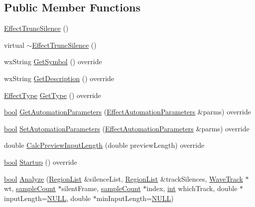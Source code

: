 \subsection*{Public Member Functions}
\begin{DoxyCompactItemize}
\item 
\hyperlink{class_effect_trunc_silence_a511e243b524d44a2e1b04d267779c808}{Effect\+Trunc\+Silence} ()
\item 
virtual \hyperlink{class_effect_trunc_silence_a809e25b236478f443634c3b8c0c31fb4}{$\sim$\+Effect\+Trunc\+Silence} ()
\item 
wx\+String \hyperlink{class_effect_trunc_silence_af21c9278ec1517512bcfe5caea204dbd}{Get\+Symbol} () override
\item 
wx\+String \hyperlink{class_effect_trunc_silence_a1ca210d00302b04300c66fd28e40664a}{Get\+Description} () override
\item 
\hyperlink{_effect_interface_8h_a4809a7bb3fd1a421902a667cc1405d43}{Effect\+Type} \hyperlink{class_effect_trunc_silence_a872b2edd882b062498b9f37d95c4d340}{Get\+Type} () override
\item 
\hyperlink{mac_2config_2i386_2lib-src_2libsoxr_2soxr-config_8h_abb452686968e48b67397da5f97445f5b}{bool} \hyperlink{class_effect_trunc_silence_ac9232fe5cdf3d12f588b9e706be6fb6d}{Get\+Automation\+Parameters} (\hyperlink{class_effect_automation_parameters}{Effect\+Automation\+Parameters} \&parms) override
\item 
\hyperlink{mac_2config_2i386_2lib-src_2libsoxr_2soxr-config_8h_abb452686968e48b67397da5f97445f5b}{bool} \hyperlink{class_effect_trunc_silence_ae106b0a91b203ccefc0a866b70b90df6}{Set\+Automation\+Parameters} (\hyperlink{class_effect_automation_parameters}{Effect\+Automation\+Parameters} \&parms) override
\item 
double \hyperlink{class_effect_trunc_silence_ae700223d7e6f5e6d0ae9ade60f2cb6e4}{Calc\+Preview\+Input\+Length} (double preview\+Length) override
\item 
\hyperlink{mac_2config_2i386_2lib-src_2libsoxr_2soxr-config_8h_abb452686968e48b67397da5f97445f5b}{bool} \hyperlink{class_effect_trunc_silence_a7c3ba17d97a79de598a9d035f9e391a6}{Startup} () override
\item 
\hyperlink{mac_2config_2i386_2lib-src_2libsoxr_2soxr-config_8h_abb452686968e48b67397da5f97445f5b}{bool} \hyperlink{class_effect_trunc_silence_a07cbde72571e71fbfc1c49db17245182}{Analyze} (\hyperlink{class_region_list}{Region\+List} \&silence\+List, \hyperlink{class_region_list}{Region\+List} \&track\+Silences, \hyperlink{class_wave_track}{Wave\+Track} $\ast$wt, \hyperlink{include_2audacity_2_types_8h_afa427e1f521ea5ec12d054e8bd4d0f71}{sample\+Count} $\ast$silent\+Frame, \hyperlink{include_2audacity_2_types_8h_afa427e1f521ea5ec12d054e8bd4d0f71}{sample\+Count} $\ast$index, \hyperlink{xmltok_8h_a5a0d4a5641ce434f1d23533f2b2e6653}{int} which\+Track, double $\ast$input\+Length=\hyperlink{px__mixer_8h_a070d2ce7b6bb7e5c05602aa8c308d0c4}{N\+U\+LL}, double $\ast$min\+Input\+Length=\hyperlink{px__mixer_8h_a070d2ce7b6bb7e5c05602aa8c308d0c4}{N\+U\+LL})

\end{DoxyCompactItemize}
